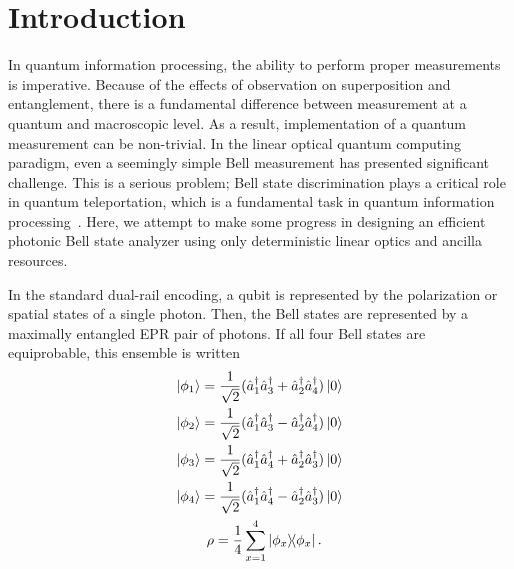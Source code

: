 \documentclass[aps,pra,twocolumn,showpacs,superscriptaddress,floatfix,10pt]{revtex4}
\begin{document}
\section{Introduction}
\label{Intro}
In quantum information processing, the ability to perform proper measurements is imperative. Because of the effects of observation on superposition and entanglement, there is a fundamental difference between measurement at a quantum and macroscopic level. As a result, implementation of a quantum measurement can be non-trivial. In the linear optical quantum computing paradigm, even a seemingly simple Bell measurement has presented significant challenge. This is a serious problem; Bell state discrimination plays a critical role in quantum teleportation, which is a fundamental task in quantum information processing~\cite{Chuang}. Here, we attempt to make some progress in designing an efficient photonic Bell state analyzer using only deterministic linear optics and ancilla resources. 

In the standard dual-rail encoding, a qubit is represented by the polarization or spatial states of a single photon. Then, the Bell states are represented by a maximally entangled EPR pair of photons. If all four Bell states are equiprobable, this ensemble is written
\begin{eqnarray}
\label{Bell States Creation Operator 1}
\ket{\phi_1} = \frac{1}{\sqrt{2}} (\hat{a}_1^\dagger \hat{a}_3^\dagger + \hat{a}_2^\dagger \hat{a}_4^\dagger) \ket{0} \\
\label{Bell States Creation Operator 2}
\ket{\phi_2} = \frac{1}{\sqrt{2}} (\hat{a}_1^\dagger \hat{a}_3^\dagger - \hat{a}_2^\dagger \hat{a}_4^\dagger) \ket{0} \\
\label{Bell States Creation Operator 3}
\ket{\phi_3} = \frac{1}{\sqrt{2}} (\hat{a}_1^\dagger \hat{a}_4^\dagger + \hat{a}_2^\dagger \hat{a}_3^\dagger) \ket{0} \\
\label{Bell States Creation Operator 4}
\ket{\phi_4} = \frac{1}{\sqrt{2}} (\hat{a}_1^\dagger \hat{a}_4^\dagger - \hat{a}_2^\dagger \hat{a}_3^\dagger) \ket{0} \\
\label{Bell State Ensemble}
\rho = \frac{1}{4} \sum_{x=1}^{4} \outerproduct{\phi_x}{\phi_x}. \quad  \enspace
\end{eqnarray}
\end{document}
